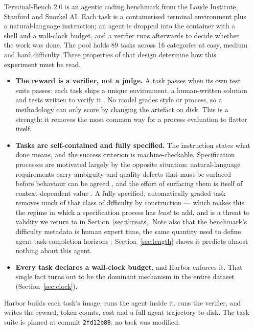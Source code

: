 \documentclass[11pt,a4paper]{article}
\newcommand{\code}[1]{\texttt{\small #1}}
\begin{document}
Terminal-Bench 2.0 \citep{merrill2026terminalbench} is an agentic coding benchmark from the
Laude Institute, Stanford and Snorkel AI. Each task is a containerised terminal environment plus a natural-language
instruction; an agent is dropped into the container with a shell and a wall-clock budget, and
a verifier runs afterwards to decide whether the work was done. The pool holds 89 tasks
across 16 categories at easy, medium and hard difficulty. Three properties of that design
determine how this experiment must be read.

\begin{itemize}
\item \textbf{The reward is a verifier, not a judge.} A task passes when its own test suite
      passes: each task ships a unique environment, a human-written solution and tests written
      to verify it \citep{merrill2026terminalbench}. No model grades style or process, so a
      methodology can only score by changing the artefact on disk. This is a strength: it
      removes the most common way for a process evaluation to flatter itself.
\item \textbf{Tasks are self-contained and fully specified.} The instruction states what
      done means, and the success criterion is machine-checkable. Specification processes are
      motivated largely by the opposite situation: natural-language requirements carry
      ambiguity and quality defects that must be surfaced before behaviour can be agreed
      \citep{femmer2017smells}, and the effort of surfacing them is itself of
      context-dependent value \citep{ribeiro2020ambiguity}. A fully specified, automatically
      graded task removes much of that class of difficulty by construction --- which makes
      this the regime in which a specification process has \emph{least} to add, and is a
      threat to validity we return to in Section~\ref{sec:threats}. Note also that the
      benchmark's difficulty metadata is human expert time, the same quantity used to define
      agent task-completion horizons \citep{kwa2025horizons}; Section~\ref{sec:length} shows
      it predicts almost nothing about this agent.
\item \textbf{Every task declares a wall-clock budget}, and Harbor enforces it. That single
      fact turns out to be the dominant mechanism in the entire dataset
      (Section~\ref{sec:clock}).
\end{itemize}

Harbor builds each task's image, runs the agent inside it, runs the verifier, and writes the
reward, token counts, cost and a full agent trajectory to disk. The task suite is pinned at
commit \code{2fd12b88}; no task was modified.
\end{document}
